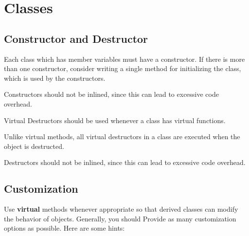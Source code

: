 \section{Classes}

\subsection{Constructor and Destructor}
\label{s:ConstructorAndDestructor}


Each class which has member variables must have a constructor. If
there is more than one constructor, consider writing a single
method for initializing the class, which is used by the
constructors.
  
\begin{note}       
  Constructors should not be inlined, since this can lead to 
  excessive code overhead.
\end{note}  
  
Virtual Destructors should be used whenever a class has virtual
functions.
  
\begin{notes}
  \item       
  Unlike virtual methods, all virtual destructors in a class are 
  executed when the object is destructed.
  \item Destructors should not be inlined, since this can
  lead to excessive code overhead.
\end{notes}



\subsection{Customization}
\label{s:Customization}

Use \textbf{virtual} methods whenever appropriate so that derived
classes can modify the behavior of objects. Generally, you should
Provide as many customization options as possible. Here are some
hints:

